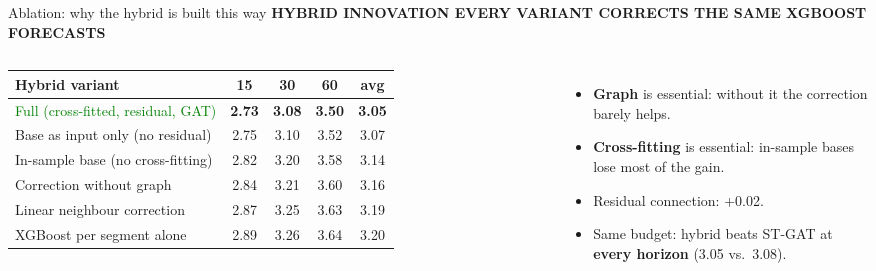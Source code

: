 \documentclass[aspectratio=169,11pt]{beamer}
\newcommand{\kicker}[1]{{\color{accent}\scriptsize\bfseries\MakeUppercase{#1}}\par\vspace{0.3em}}
\newcommand{\hl}[1]{{\color{accent}\bfseries #1}}
\begin{document}
\begin{frame}{Ablation: why the hybrid is built this way}
\kicker{Hybrid innovation \textperiodcentered{} every variant corrects the same XGBoost forecasts}
\begin{columns}[T]
\footnotesize\setlength{\tabcolsep}{3.5pt}
\begin{tabular}{lcccc}
\toprule
Hybrid variant & 15 & 30 & 60 & avg \\
\midrule
\textcolor{green}{Full (cross-fitted, residual, GAT)} & \textbf{2.73} & \textbf{3.08} & \textbf{3.50} & \textbf{3.05} \\
Base as input only (no residual) & 2.75 & 3.10 & 3.52 & 3.07 \\
In-sample base (no cross-fitting) & 2.82 & 3.20 & 3.58 & 3.14 \\
Correction without graph & 2.84 & 3.21 & 3.60 & 3.16 \\
Linear neighbour correction & 2.87 & 3.25 & 3.63 & 3.19 \\
XGBoost per segment alone & 2.89 & 3.26 & 3.64 & 3.20 \\
\bottomrule
\end{tabular}
\begin{itemize}\setlength\itemsep{0.35em}\small
\item \hl{Graph} is essential: without it the correction barely helps.
\item \hl{Cross-fitting} is essential: in-sample bases lose most of the gain.
\item Residual connection: +0.02.
\item Same budget: hybrid beats ST-GAT at \hl{every horizon} (3.05 vs.\ 3.08).
\end{itemize}
\end{columns}
\end{frame}
\end{document}
